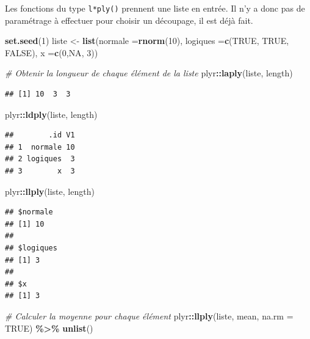 \documentclass[
  11pt,
]{book}
\newenvironment{Shaded}{\begin{snugshade}}{\end{snugshade}}
\newcommand{\CommentTok}[1]{\textcolor[rgb]{0.56,0.35,0.01}{\textit{#1}}}
\newcommand{\DataTypeTok}[1]{\textcolor[rgb]{0.13,0.29,0.53}{#1}}
\newcommand{\DecValTok}[1]{\textcolor[rgb]{0.00,0.00,0.81}{#1}}
\newcommand{\KeywordTok}[1]{\textcolor[rgb]{0.13,0.29,0.53}{\textbf{#1}}}
\newcommand{\NormalTok}[1]{#1}
\newcommand{\OperatorTok}[1]{\textcolor[rgb]{0.81,0.36,0.00}{\textbf{#1}}}
\newcommand{\OtherTok}[1]{\textcolor[rgb]{0.56,0.35,0.01}{#1}}
\newcommand{\StringTok}[1]{\textcolor[rgb]{0.31,0.60,0.02}{#1}}
\numberwithin{equation}{section}
\numberwithin{countremarque}{section}
\begin{document}
Les fonctions du type \texttt{l*ply()} prennent une liste en entrée. Il n'y a donc pas de paramétrage à effectuer pour choisir un découpage, il est déjà fait.

\begin{Shaded}
\begin{Highlighting}[]
\KeywordTok{set.seed}\NormalTok{(}\DecValTok{1}\NormalTok{)}
\NormalTok{liste \textless{}{-}}
\StringTok{  }\KeywordTok{list}\NormalTok{(}\DataTypeTok{normale =}\KeywordTok{rnorm}\NormalTok{(}\DecValTok{10}\NormalTok{),}
       \DataTypeTok{logiques =}\KeywordTok{c}\NormalTok{(}\OtherTok{TRUE}\NormalTok{, }\OtherTok{TRUE}\NormalTok{, }\OtherTok{FALSE}\NormalTok{),}
       \DataTypeTok{x =}\KeywordTok{c}\NormalTok{(}\DecValTok{0}\NormalTok{,}\OtherTok{NA}\NormalTok{, }\DecValTok{3}\NormalTok{))}

\CommentTok{\# Obtenir la longueur de chaque élément de la liste}
\NormalTok{plyr}\OperatorTok{::}\KeywordTok{laply}\NormalTok{(liste, length)}
\end{Highlighting}
\end{Shaded}

\begin{lstlisting}
## [1] 10  3  3
\end{lstlisting}

\begin{Shaded}
\begin{Highlighting}[]
\NormalTok{plyr}\OperatorTok{::}\KeywordTok{ldply}\NormalTok{(liste, length)}
\end{Highlighting}
\end{Shaded}

\begin{lstlisting}
##        .id V1
## 1  normale 10
## 2 logiques  3
## 3        x  3
\end{lstlisting}

\begin{Shaded}
\begin{Highlighting}[]
\NormalTok{plyr}\OperatorTok{::}\KeywordTok{llply}\NormalTok{(liste, length)}
\end{Highlighting}
\end{Shaded}

\begin{lstlisting}
## $normale
## [1] 10
## 
## $logiques
## [1] 3
## 
## $x
## [1] 3
\end{lstlisting}

\begin{Shaded}
\begin{Highlighting}[]
\CommentTok{\# Calculer la moyenne pour chaque élément}
\NormalTok{plyr}\OperatorTok{::}\KeywordTok{llply}\NormalTok{(liste, mean, }\DataTypeTok{na.rm =} \OtherTok{TRUE}\NormalTok{) }\OperatorTok{\%\textgreater{}\%}\StringTok{ }
\StringTok{  }\KeywordTok{unlist}\NormalTok{()}
\end{Highlighting}
\end{Shaded}
\end{document}
